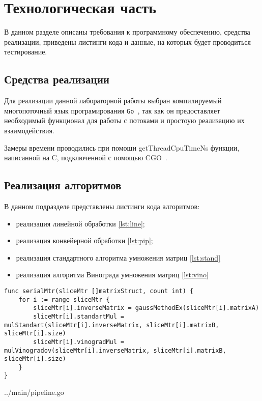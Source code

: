 \chapter{Технологическая часть}

В данном разделе описаны требования к программному обеспечению, средства реализации, приведены листинги кода и данные, 
на которых будет проводиться тестирование.

\section{Средства реализации}
Для реализации данной лабораторной работы выбран компилируемый многопоточный
язык програмирования \texttt{Go}~\cite{golang}, так как он предоставляет
необходимый функционал для работы с потоками и простоую реализацию их
взаимодействия.

Замеры времени проводились при помощи getThreadCpuTimeNs функции, написанной на C, 
подключенной с помощью CGO~\cite{cgo}.

\newpage
\section{Реализация алгоритмов}

В данном подразделе представлены листинги кода алгоритмов:
\begin{itemize}
    \item реализация линейной обработки \ref{lst:line};
    \item реализация конвейерной обработки \ref{lst:pip};
    \item реализация стандартного алгоритма умножения матриц \ref{lst:stand}
    \item реализация алгоритма Винограда умножения матриц \ref{lst:vino}
\end{itemize}

\begin{lstlisting}[label=lst:line,caption=Релизация линейной обработки]
func serialMtr(sliceMtr []matrixStruct, count int) {
    for i := range sliceMtr {
        sliceMtr[i].inverseMatrix = gaussMethodEx(sliceMtr[i].matrixA)
        sliceMtr[i].standartMul = mulStandart(sliceMtr[i].inverseMatrix, sliceMtr[i].matrixB, sliceMtr[i].size)
        sliceMtr[i].vinogradMul = mulVinogradov(sliceMtr[i].inverseMatrix, sliceMtr[i].matrixB, sliceMtr[i].size)
    }
}
\end{lstlisting}

\begin{lstinputlisting}[
    caption={Релизация линейной обработки},
    label={lst:pip},
    linerange={8-82}
]{../main/pipeline.go}
\end{lstinputlisting}

